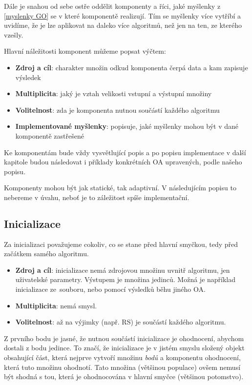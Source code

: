 Dále je snahou od sebe ostře oddělit komponenty a říci, jaké myšlenky z \ref{myslenky GO} se v které komponentě realizují. Tím se myšlenky více vytříbí a uvidíme, že je lze aplikovat na daleko více algoritmů, než jen na ten, ze kterého vzešly.

Hlavní náležitosti komponent můžeme popsat výčtem:
\begin{itemize}
  \item \textbf{Zdroj a cíl}: charakter množin odkud komponenta čerpá data a kam zapisuje výsledek
  \item \textbf{Multiplicita}: jaký je vztah velikosti vstupní a výstupní množiny
  \item \textbf{Volitelnost}: zda je komponenta nutnou součástí každého algoritmu
  \item \textbf{Implementované myšlenky}: popisuje, jaké myšlenky mohou být v dané komponentě zastřešené
\end{itemize}
Ke komponentám bude vždy vysvětlující popis a po popisu implementace v další kapitole budou následovat i příklady konkrétních OA upravených, podle našeho popisu.

Komponenty mohou být jak statické, tak adaptivní. V následujícím popisu to nebereme v úvahu, neboť je to záležitost spíše implementační.

\subsection{Inicializace}\label{def inicializace}

Za inicializaci považujeme cokoliv, co se stane před hlavní smyčkou, tedy před začátkem samého algoritmu.
\begin{itemize}
  \item \textbf{Zdroj a cíl}: inicializace nemá zdrojovou množinu uvnitř algoritmu, jen uživatelské parametry. Výstupem je množina jedinců. Možná je například inicializace ze~souboru, nebo pomocí výsledků běhu jiného OA.
  \item \textbf{Multiplicita}: nemá smysl.
  \item \textbf{Volitelnost}: až na výjimky (např. RS) je součástí každého algoritmu.
\end{itemize}

Z prvního bodu je jasné, že nutnou součástí inicializace je ohodnocení, abychom dostali z bodu jedince. To značí, že inicializace je v jistém smyslu složený objekt obsahující část, která nejprve vytvoří množinu \emph{bodů} a komponentu ohodnocení, která tuto množinu ohodnotí. Tato množina (většinou populace) ovšem nemusí být shodná s tou, která je ohodnocována v hlavní smyčce (většinou potomstvo).

